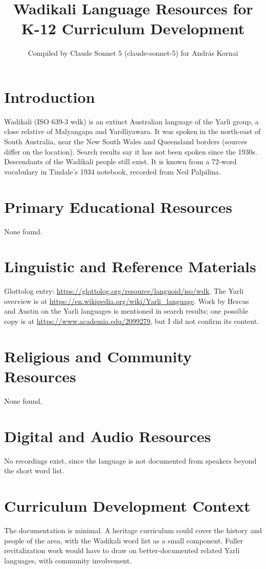 \documentclass[12pt]{article}
\title{Wadikali Language Resources for K-12 Curriculum Development}
\author{Compiled by Claude Sonnet 5 (claude-sonnet-5) for Andr\'as Kornai}
\date{}
\begin{document}
\maketitle

\section{Introduction}
Wadikali (ISO 639-3 wdk) is an extinct Australian language of the Yarli group, a close relative of Malyangapa and Yardliyawara. It was spoken in the north-east of South Australia, near the New South Wales and Queensland borders (sources differ on the location). Search results say it has not been spoken since the 1930s. Descendants of the Wadikali people still exist. It is known from a 72-word vocabulary in Tindale's 1934 notebook, recorded from Ned Palpilina.

\section{Primary Educational Resources}
None found.

\section{Linguistic and Reference Materials}
Glottolog entry: \url{https://glottolog.org/resource/languoid/iso/wdk}. The Yarli overview is at \url{https://en.wikipedia.org/wiki/Yarli_language}. Work by Hercus and Austin on the Yarli languages is mentioned in search results; one possible copy is at \url{https://www.academia.edu/2099279}, but I did not confirm its content.

\section{Religious and Community Resources}
None found.

\section{Digital and Audio Resources}
No recordings exist, since the language is not documented from speakers beyond the short word list.

\section{Curriculum Development Context}
The documentation is minimal. A heritage curriculum could cover the history and people of the area, with the Wadikali word list as a small component. Fuller revitalization work would have to draw on better-documented related Yarli languages, with community involvement.
\end{document}
